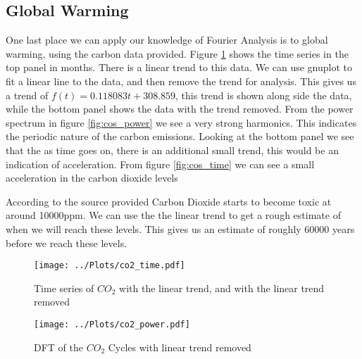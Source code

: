\subsection{Global Warming}
One last place we can apply our knowledge of Fourier Analysis is to global warming, using the carbon data provided. 
Figure \ref{fig:co2_time} shows the time series in the top panel in months. 
There is a linear trend to this data. 
We can use gnuplot to fit a linear line to the data, and then remove the trend for analysis. 
This gives us a trend of $f(t) = 0.118083t + 308.859$, this trend is shown along side the data, while the bottom panel shows the data with the trend removed. 
From the power spectrum in figure \ref{fig:cos_power} we see a very strong harmonics. 
This indicates the periodic nature of the carbon emissions. 
Looking at the bottom panel we see that the as time goes on, there is an additional small trend, this would be an indication of acceleration. 
From figure \ref{fig:cos_time} we can see a small acceleration in the carbon dioxide levels

According to the source provided Carbon Dioxide starts to become toxic at around 10000ppm. 
We can use the the linear trend to get a rough estimate of when we will reach these levels. 
This gives us an estimate of roughly 60000 years before we reach these levels. 


\begin{figure}[ht]
    \centering
    \texttt{[image: ../Plots/co2\_time.pdf]}
    \caption{Time series of $CO_{2}$ with the linear trend, and with the linear trend removed}
    \label{fig:co2_time}
\end{figure}

\begin{figure}[ht]
    \centering
    \texttt{[image: ../Plots/co2\_power.pdf]}
    \caption{DFT of the $CO_{2}$ Cycles with linear trend removed}
    \label{fig:co2_power}
\end{figure}




